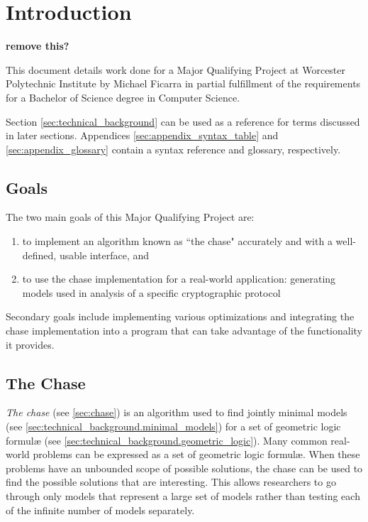 \section{Introduction}

	\textbf{ remove this? }

	This document details work done for a Major Qualifying Project at Worcester
	Polytechnic Institute by Michael Ficarra in partial fulfillment of the
	requirements for a Bachelor of Science degree in Computer Science.

	Section \ref{sec:technical_background} can be used as a reference for terms
	discussed in later sections. Appendices \ref{sec:appendix_syntax_table} and
	\ref{sec:appendix_glossary} contain a syntax reference and glossary,
	respectively.

	\subsection{Goals}

		The two main goals of this Major Qualifying Project are:

		\begin{enumerate}
		\item to implement an algorithm known as ``the chase" accurately
		and with a well-defined, usable interface, and
		\item to use the chase implementation for a real-world
		application: generating models used in analysis of a specific
		cryptographic protocol
		\end{enumerate}

		Secondary goals include implementing various optimizations and
		integrating the chase implementation into a program that can take
		advantage of the functionality it provides.

	\subsection{The Chase}

		\emph{The chase} (see \ref{sec:chase}) is an algorithm used to find
		jointly minimal models (see
		\ref{sec:technical_background.minimal_models}) for a set of geometric
		logic formul{\ae} (see \ref{sec:technical_background.geometric_logic}).
		Many common real-world problems can be expressed as a set of geometric
		logic formul{\ae}. When these problems have an unbounded scope of
		possible solutions, the chase can be used to find the possible
		solutions that are interesting. This allows researchers to go through
		only models that represent a large set of models rather than testing
		each of the infinite number of models separately.

